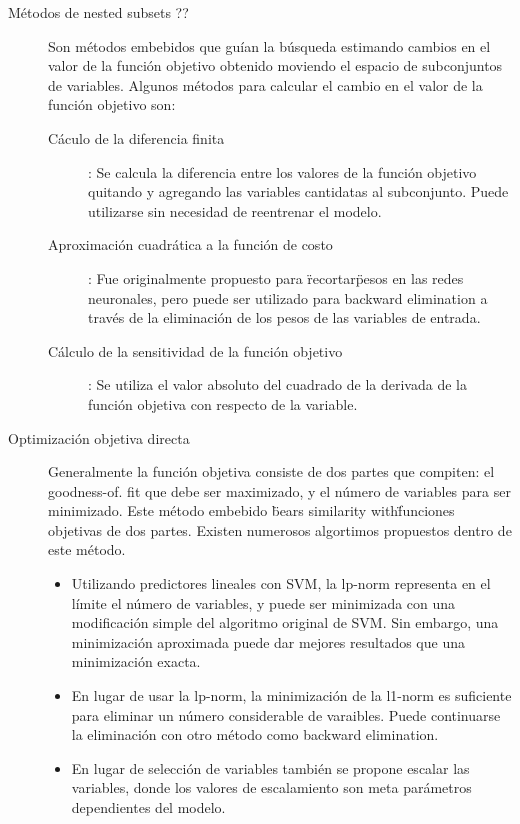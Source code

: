 \documentclass[11pt,spanish]{article}
\begin{document}
\begin{description}
    \item[Métodos de nested subsets ??] Son métodos embebidos que 
    guían la búsqueda estimando cambios en el valor de la función 
    objetivo obtenido moviendo el espacio de subconjuntos de 
    variables. Algunos métodos para calcular el cambio en el valor de la función objetivo son:
    \begin{description}
        \item[Cáculo de la diferencia finita]: Se calcula la
        diferencia entre los valores de la función objetivo
        quitando y agregando las variables cantidatas al 
        subconjunto. Puede utilizarse sin necesidad de reentrenar 
        el modelo.
        \item[Aproximación cuadrática a la función de costo]: Fue 
        originalmente propuesto para \"recortar\" pesos en las 
        redes neuronales, pero puede ser utilizado para backward 
        elimination a través de la eliminación de los pesos de 
        las variables de entrada.
        \item[Cálculo de la sensitividad de la función objetivo]: 
        Se utiliza el valor absoluto del cuadrado de la derivada 
        de la función objetiva con respecto de la variable.
    \end{description}

    \item[Optimización objetiva directa] Generalmente la función 
    objetiva consiste de dos partes que compiten: el goodness-of.
    fit que debe ser maximizado, y el número de variables para 
    ser minimizado. Este método embebido \"bears similarity with\"
    funciones objetivas de dos partes. Existen numerosos 
    algortimos propuestos dentro de este método.
    \begin{itemize}
        \item Utilizando predictores lineales con SVM, la lp-norm 
        representa en el límite el número de variables, y puede 
        ser minimizada con una modificación simple del algoritmo 
        original de SVM. Sin embargo, una minimización aproximada 
        puede dar mejores resultados que una minimización exacta.
        \item En lugar de usar la lp-norm, la minimización de la 
        l1-norm es suficiente para eliminar un número 
        considerable de varaibles. Puede continuarse la 
        eliminación con otro método como backward elimination.
        \item En lugar de selección de variables también se 
        propone escalar las variables, donde los valores de 
        escalamiento son meta parámetros dependientes del modelo.
    \end{itemize}


\end{description}
\end{document}
